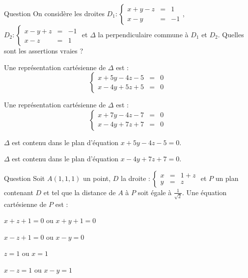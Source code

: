 \begin{multi}[multiple,feedback=
{Soit \(D_1\) une droite passant par un point \(A_1\) et dirigée par un vecteur \(\vec{u_1}\) et 
\(D_2\) une droite passant par un point \(A_2\) et dirigée par un vecteur \(\vec{u_2}\), telles que \(D_1\) et \(D_2\) ne soient pas parallèles. Soit \(P_1\) le plan passant par \(A_1\) et dirigé par les vecteurs \(\vec{u_1}\) et \(\vec{u_1} \wedge \vec{u_2}\) et 
\(P_2\) le plan passant par \(A_2\) et dirigé par les vecteurs \(\vec{u_2}\) et \(\vec{u_1} \wedge \vec{u_2}\). Alors, la perpendiculaire commune à \(D_1\) et \(D_2\) est l'intersection de \(P_1\) et \(P_2\).
}]{Question}
On considère les droites \(D_1 : \left\{\begin{array}{ccl}x+y-z&=&1\\x-y&=&-1 \end{array}\right.\),  
\(D_2 : \left\{\begin{array}{ccl}x-y+z&=&-1\\x-z&=&1 \end{array}\right.\)
et \(\Delta\) la perpendiculaire commune à \(D_1\) et \(D_2\). Quelles sont les assertions vraies ?

    \item Une représentation cartésienne de \(\Delta\) est :
\[\left\{\begin{array}{ccl}x+5y-4z-5&=&0\\x-4y+5z+5&=&0 \end{array}\right.\]
    \item* Une représentation cartésienne de \(\Delta\) est :
\[\left\{\begin{array}{ccl}x+7y-4z-7&=&0\\x-4y+7z+7&=&0 \end{array}\right.\]
    \item \(\Delta\) est contenu dans le plan d'équation \( x+5y-4z-5=0\).
    \item* \(\Delta\) est contenu dans le plan d'équation \(x-4y+7z+7=0\).
\end{multi}


\begin{multi}[multiple,feedback=
{\(P\) est différent du plan d'équation  \(y-z=0\) et \(D \subset P\), une équation cartésienne de \(P\) est donc de la forme : \((x-z-1)+ \alpha (y-z)=0\). On calcule \(\alpha\) pour que la distance de \(A\) à \(P\) soit égal à \(\frac{1}{\sqrt 2}\).
}]{Question}
Soit  \(A(1,1,1)\) un point,  \(D\) la droite  \( : \left\{\begin{array}{ccl}x&=&1+z\\y&=&z \end{array}\right.\) et \(P\) un plan contenant \(D\) et tel que la distance de \(A\) à \(P\) soit égale à   \(\frac{1}{\sqrt 2}\). Une équation cartésienne de \(P\) est :

    \item \(x+z+1=0\) ou \(x+y+1=0\)
    \item \(x-z+1=0\) ou \(x-y=0\)
    \item \(z=1\) ou \(x=1\)
    \item* \(x-z=1\) ou \(x-y=1\)
\end{multi}


